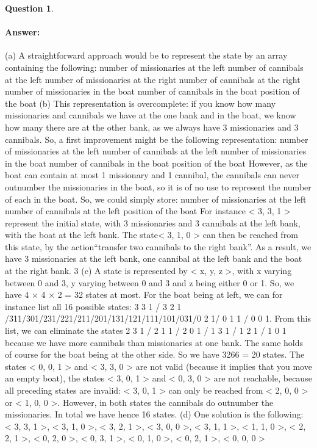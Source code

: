 \documentclass[11pt,a4paper]{article}
\theoremstyle{definition}%
\newtheorem{Q}{Question}[] %
\newcommand{\reponse}[1]{%
\ifthenelse {\boolean{corrige}} {\paragraph{Answer:} \color{darkblue}   #1\color{black}} {}
}
\begin{document}
\begin{Q}
\reponse{
    (a) A straightforward approach would be to represent the state by an array containing the
following:
 number of missionaries at the left
 number of cannibals at the left
 number of missionaries at the right
 number of cannibals at the right
 number of missionaries in the boat
 number of cannibals in the boat
 position of the boat
(b) This representation is overcomplete: if you know how many missionaries and cannibals
we have at the one bank and in the boat, we know how many there are at the other
bank, as we always have 3 missionaries and 3 cannibals. So, a first improvement might
be the following representation:
 number of missionaries at the left
 number of cannibals at the left
 number of missionaries in the boat
 number of cannibals in the boat
 position of the boat
However, as the boat can contain at most 1 missionary and 1 cannibal, the cannibals
can never outnumber the missionaries in the boat, so it is of no use to represent the
number of each in the boat. So, we could simply store:
 number of missionaries at the left
 number of cannibals at the left
 position of the boat
For instance < 3, 3, 1 > represent the initial state, with 3 missionaries and 3 cannibals
at the left bank, with the boat at the left bank. The state< 3, 1, 0 > can then be
reached from this state, by the action“transfer two cannibals to the right bank”. As a
result, we have 3 missionaries at the left bank, one cannibal at the left bank and the
boat at the right bank.
3
(c) A state is represented by < x, y, z >, with x varying between 0 and 3, y varying between
0 and 3 and z being either 0 or 1. So, we have 4 × 4 × 2 = 32 states at most.
For the boat being at left, we can for instance list all 16 possible states: 3 3 1 / 3 2 1
/311/301/231/221/211/201/131/121/111/101/031/0
2 1/ 0 1 1 / 0 0 1.
From this list, we can eliminate the states 2 3 1 / 2 1 1 / 2 0 1 / 1 3 1 / 1 2 1 / 1 0
1 because we have more cannibals than missionaries at one bank. The same holds of
course for the boat being at the other side. So we have 3266 = 20 states.
The states < 0, 0, 1 > and < 3, 3, 0 > are not valid (because it implies that you move
an empty boat), the states < 3, 0, 1 > and < 0, 3, 0 > are not reachable, because
all preceding states are invalid: < 3, 0, 1 > can only be reached from < 2, 0, 0 > or
< 1, 0, 0 >. However, in both states the cannibals do outnumber the missionaries. In
total we have hence 16 states.
(d) One solution is the following:
< 3, 3, 1 >, < 3, 1, 0 >, < 3, 2, 1 >, < 3, 0, 0 >, < 3, 1, 1 >, < 1, 1, 0 >, < 2, 2, 1 >,
< 0, 2, 0 >, < 0, 3, 1 >, < 0, 1, 0 >, < 0, 2, 1 >, < 0, 0, 0 >

}
\end{Q}
\end{document}
